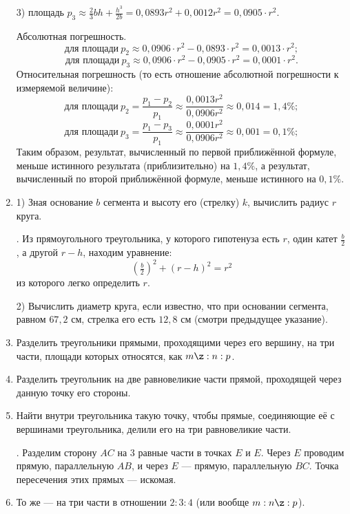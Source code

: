 \begin{enumerate}[resume]
3) площадь $p_3\approx \tfrac23 bh+\frac{h^3}{2b}=0{,}0893r^2+0{,}0012r^2=0{,}0905\cdot r^2$.

Абсолютная погрешность.
\[\text{для площади}~p_2 \approx 0{,}0906\cdot r^2 - 0{,}0893\cdot r^2 = 0{,}0013\cdot r^2;\]
\[\text{для площади}~p_3 \approx 0{,}0906\cdot r^2 - 0{,}0905\cdot r^2 = 0{,}0001\cdot r^2.\]
Относительная погрешность (то есть отношение абсолютной погрешности к измеряемой величине):
\[\text{для площади}~p_2 = \frac{p_1-p_2}{p_1}\approx\frac{0{,}0013r^2}{0{,}0906r^2}\approx0{,}014 = 1{,}4\%;\]
\[\text{для площади}~p_3 = \frac{p_1-p_3}{p_1}\approx\frac{0{,}0001r^2}{0{,}0906r^2}\approx0{,}001 = 0{,}1\%;\]
Таким образом, результат, вычисленный по первой приближённой формуле, меньше истинного результата (приблизительно) на $1{,}4\%$, а результат, вычисленный по второй приближённой формуле, меньше истинного на $0{,}1\%$.

\item
1) Зная основание $b$ сегмента и высоту его (стрелку) $k$, вычислить радиус $r$ круга.

\smallskip
{}.
Из прямоугольного треугольника, у которого гипотенуза есть $r$, один катет $\frac b2$, а другой $r-h$, находим уравнение:
\[(\tfrac b2)^2+(r-h)^2=r^2\]
из которого легко определить $r$.

2) Вычислить диаметр круга, если известно, что при основании сегмента, равном $67{,}2$ см, стрелка его есть $12{,}8$ см (смотри предыдущее указание).

\smallskip
{}

\item
Разделить треугольники прямыми, проходящими через его вершину, на три части, площади которых относятся, как $m\z:n:p$.

\item
Разделить треугольник на две равновеликие части прямой, проходящей через данную точку его стороны.

\item
Найти внутри треугольника такую точку, чтобы прямые, соединяющие её с вершинами треугольника, делили его на три равновеликие части.

\smallskip
{}.
Разделим сторону $AC$ на $3$ равные части в точках $E$ и $E$.
Через $E$ проводим прямую, параллельную $AB$, и через $E$ — прямую, параллельную $BC$.
Точка пересечения этих прямых — искомая.

\item
То же — на три части в отношении $2:3:4$ (или вообще $m:n\z:p$).


\end{enumerate}
